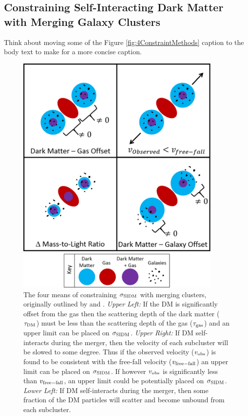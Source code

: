 \subsection{Constraining Self-Interacting Dark Matter with Merging Galaxy Clusters}\label{section:DMconstraintWithMergers}

Think about moving some of the Figure \ref{fig:4ConstraintMethods} caption to the body text to make for a more concise caption.

\begin{figure}
\centering
\includegraphics[width=4in]{Chapter1/4ConstraintMethods.png}
\caption{The four means of constraining $\sigma_{\rm SIDM}$ with merging clusters, originally outlined by \citet{Markevitch:2004dl} and \citet{Randall:2008hs}. 
\emph{Upper Left:} If the DM is significantly offset from the gas then the scattering depth of the dark matter ($\tau_{\rm DM}$) must be less than the scattering depth of the gas ($\tau_{\rm gas}$) and an upper limit can be placed on $\sigma_{\rm SIDM}$.
\emph{Upper Right:} If DM self-interacts during the merger, then the velocity of each subcluster will be slowed to some degree.
Thus if the observed velocity ($v_{\rm obs}$) is found to be consistent with the free-fall velocity ($v_{\rm free-fall}$) an upper limit can be placed on $\sigma_{\rm SIDM}$.
If however $v_{\rm obs}$ is significantly less than $v_{\rm free-fall}$, an upper limit could be potentially placed on $\sigma_{\rm SIDM}$.
\emph{Lower Left:} If DM self-interacts during the merger, then some fraction of the DM particles will scatter and become unbound from each subcluster.
}
\end{figure}
